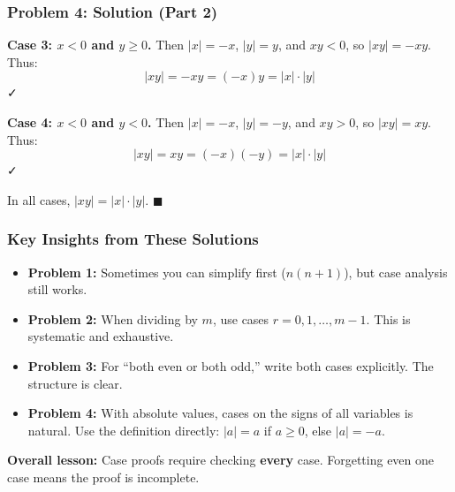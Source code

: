 \documentclass{beamer}
\begin{document}
\begin{frame}
  \frametitle{Problem 4: Solution (Part 2)}

  \textbf{Case 3: $x < 0$ and $y \geq 0$.} Then $|x| = -x$, $|y| = y$, and $xy < 0$, so $|xy| = -xy$. Thus:
  $$|xy| = -xy = (-x)y = |x| \cdot |y|$$ ✓

  \vspace{0.3cm}
  \textbf{Case 4: $x < 0$ and $y < 0$.} Then $|x| = -x$, $|y| = -y$, and $xy > 0$, so $|xy| = xy$. Thus:
  $$|xy| = xy = (-x)(-y) = |x| \cdot |y|$$ ✓

  \vspace{0.3cm}
  In all cases, $|xy| = |x| \cdot |y|$. \hfill $\blacksquare$
\end{frame}

\begin{frame}
  \frametitle{Key Insights from These Solutions}

  \begin{itemize}
    \item {\color{maroon}\textbf{Problem 1:}} Sometimes you can simplify first ($n(n+1)$), but case analysis still works.
    
    \item {\color{maroon}\textbf{Problem 2:}} When dividing by $m$, use cases $r = 0, 1, \ldots, m-1$. This is systematic and exhaustive.
    
    \item {\color{maroon}\textbf{Problem 3:}} For ``both even or both odd,'' write both cases explicitly. The structure is clear.
    
    \item {\color{maroon}\textbf{Problem 4:}} With absolute values, cases on the signs of all variables is natural. Use the definition directly: $|a| = a$ if $a \geq 0$, else $|a| = -a$.
  \end{itemize}

  \vspace{0.3cm}
  {\color{darkmaroon}\textbf{Overall lesson:}} Case proofs require checking \textbf{every} case. Forgetting even one case means the proof is incomplete.
\end{frame}
\end{document}
